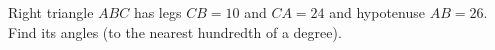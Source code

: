 Right triangle $ABC$ has legs $CB=10$ and $CA=24$ and hypotenuse $AB=26$. Find its angles (to the nearest hundredth of a degree).
